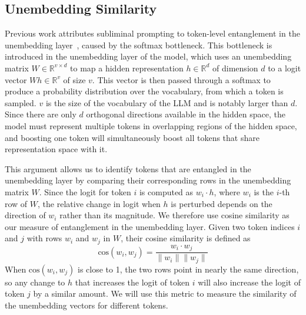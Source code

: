 \documentclass[10pt,twocolumn]{article}
\begin{document}
\subsection{Unembedding Similarity}\label{sec:exp-unembedding-sim}
\begin{qualitymark}[cyan]
Previous work attributes subliminal prompting to token-level entanglement in the unembedding layer~\cite{zurItsOwlNumbers2025}, caused by the softmax bottleneck.
This bottleneck is introduced in the unembedding layer of the model, which uses an unembedding matrix $W\in\mathbb{R}^{v\times d}$ to map a hidden representation $h\in\mathbb{R}^d$ of dimension $d$ to a logit vector $W h\in\mathbb{R}^v$ of size $v$\cite{finlaysonClosingCuriousCase2023}.
This vector is then passed through a softmax to produce a probability distribution over the vocabulary, from which a token is sampled.
$v$ is the size of the vocabulary of the LLM and is notably larger than $d$.
Since there are only $d$ orthogonal directions available in the hidden space, the model must represent multiple tokens in overlapping regions of the hidden space, and boosting one token will simultaneously boost all tokens that share representation space with it.

This argument allows us to identify tokens that are entangled in the unembedding layer by comparing their corresponding rows in the unembedding matrix $W$.
Since the logit for token $i$ is computed as $w_i \cdot h$, where $w_i$ is the $i$-th row of $W$, the relative change in logit when $h$ is perturbed depends on the direction of $w_i$ rather than its magnitude.
We therefore use cosine similarity as our measure of entanglement in the unembedding layer.
Given two token indices $i$ and $j$ with rows $w_i$ and $w_j$ in $W$, their cosine similarity is defined as
\begin{equation}
    \text{cos}(w_i, w_j) = \frac{w_i \cdot w_j}{\|w_i\| \|w_j\|}
\end{equation}
When $\text{cos}(w_i, w_j)$ is close to 1, the two rows point in nearly the same direction, so any change to $h$ that increases the logit of token $i$ will also increase the logit of token $j$ by a similar amount.
We will use this metric to measure the similarity of the unembedding vectors for different tokens.
\end{qualitymark}
\end{document}
